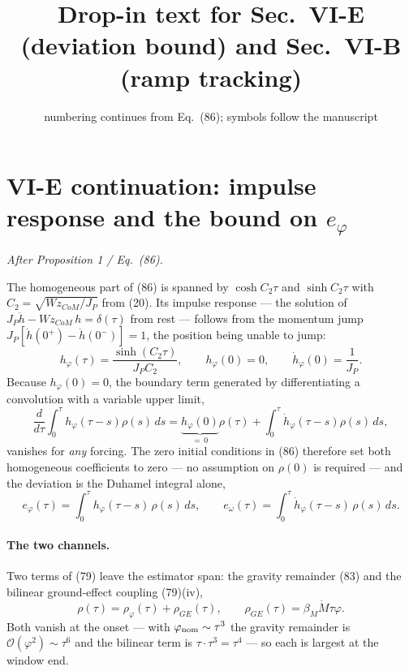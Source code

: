 \documentclass[10pt]{article}
\title{\vspace{-16mm}\textbf{Drop-in text for Sec.~VI-E (deviation bound)
and Sec.~VI-B (ramp tracking)}\vspace{-3mm}}
\date{\small numbering continues from Eq.~(86); symbols follow the manuscript}
\newcommand{\Wz}{W\!z_{CoM}}
\begin{document}
\maketitle

\section*{VI-E continuation: impulse response and the bound on $e_\varphi$}

\emph{After Proposition 1 / Eq.~(86).}

\medskip
The homogeneous part of (86) is spanned by $\cosh C_2\tau$ and
$\sinh C_2\tau$ with $C_2 = \sqrt{\Wz/J_P}$ from (20).  Its impulse
response --- the solution of $J_P\ddot h - \Wz\,h = \delta(\tau)$ from
rest --- follows from the momentum jump
$J_P[\dot h(0^+)-\dot h(0^-)] = 1$, the position being unable to jump:
\begin{equation}
  h_\varphi(\tau) = \frac{\sinh(C_2\tau)}{J_P C_2},
  \qquad h_\varphi(0) = 0,
  \qquad \dot h_\varphi(0) = \frac{1}{J_P}.
  \tag{87}
\end{equation}
Because $h_\varphi(0) = 0$, the boundary term generated by
differentiating a convolution with a variable upper limit,
\[
  \frac{d}{d\tau}\int_0^\tau h_\varphi(\tau-s)\rho(s)\,ds
  = \underbrace{h_\varphi(0)}_{=\,0}\rho(\tau)
  + \int_0^\tau \dot h_\varphi(\tau-s)\rho(s)\,ds ,
\]
vanishes for \emph{any} forcing.  The zero initial conditions in (86)
therefore set both homogeneous coefficients to zero --- no assumption on
$\rho(0)$ is required --- and the deviation is the Duhamel integral
alone,
\begin{equation}
  e_\varphi(\tau) = \int_0^\tau h_\varphi(\tau-s)\,\rho(s)\,ds ,
  \qquad
  e_\omega(\tau) = \int_0^\tau \dot h_\varphi(\tau-s)\,\rho(s)\,ds .
  \tag{88}
\end{equation}

\paragraph{The two channels.}
Two terms of (79) leave the estimator span: the gravity remainder (83)
and the bilinear ground-effect coupling (79)(iv),
\begin{equation}
  \rho(\tau) = \rho_\varphi(\tau) + \rho_{GE}(\tau),
  \qquad
  \rho_{GE}(\tau) = \beta_M \dot M \tau\varphi .
  \tag{89}
\end{equation}
Both vanish at the onset --- with $\varphi_{\rm nom}\sim\tau^3$ the
gravity remainder is $\mathcal{O}(\varphi^2)\sim\tau^6$ and the
bilinear term is $\tau\cdot\tau^3 = \tau^4$ --- so each is largest at
the window end.
\end{document}
